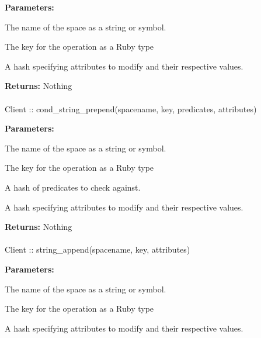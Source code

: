 \noindent\textbf{Parameters:}
\begin{description}[labelindent=\widthof{{attributes}},leftmargin=*,noitemsep,nolistsep,align=right]
\item[spacename] The name of the space as a string or symbol.
\item[key] The key for the operation as a Ruby type
\item[attributes] A hash specifying attributes to modify and their respective values.
\end{description}

\noindent\textbf{Returns:}
Nothing

\paragraph{}
\begin{ccode}
Client :: cond_string_prepend(spacename, key, predicates, attributes)
\end{ccode}
\funcdesc 

\noindent\textbf{Parameters:}
\begin{description}[labelindent=\widthof{{predicates}},leftmargin=*,noitemsep,nolistsep,align=right]
\item[spacename] The name of the space as a string or symbol.
\item[key] The key for the operation as a Ruby type
\item[predicates] A hash of predicates to check against.
\item[attributes] A hash specifying attributes to modify and their respective values.
\end{description}

\noindent\textbf{Returns:}
Nothing

\paragraph{}
\begin{ccode}
Client :: string_append(spacename, key, attributes)
\end{ccode}
\funcdesc 

\noindent\textbf{Parameters:}
\begin{description}[labelindent=\widthof{{attributes}},leftmargin=*,noitemsep,nolistsep,align=right]
\item[spacename] The name of the space as a string or symbol.
\item[key] The key for the operation as a Ruby type
\item[attributes] A hash specifying attributes to modify and their respective values.
\end{description}

